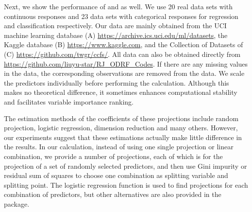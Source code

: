  Next, we show the performance of  and  as well. We use 20 real data sets with continuous responses  and 23 data sets with categorical responses for regression and classification respectively.  Our data are mainly obtained from the UCI machine learning database (A) \url{https://archive.ics.uci.edu/ml/datasets}, the Kaggle database (B) \url{https://www.kaggle.com}, and  the Collection of Datasets of \cite{rainforth2015canonical} (C) \url{https://github.com/twgr/ccfs/}. All data can also be obtained directly from \url{https://github.com/liuyu-star/RJ_ODRF_Codes}.
If there are any missing values in the data, the corresponding observations are removed from the data. %
{ We scale the predictors individually before performing the calculation. Although this makes no theoretical difference, it sometimes enhances computational stability and facilitates variable importance ranking.}  

{
The estimation methods of the coefficients of these projections include random projection, logistic regression, dimension reduction and many others. However, our experiments suggest that these estimations actually make little difference in
the results. In our calculation, instead of using one single projection or linear combination, we provide
a number of projections, each of which is for the projection of a set of randomly selected predictors, and then use Gini impurity or residual sum of squares to choose one combination as splitting variable and splitting point. The logistic regression function is used to find projections for each combination of predictors, but other alternatives are also provided in the package.}

